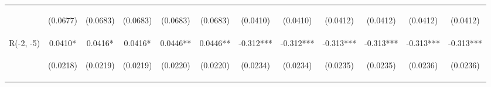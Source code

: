 \documentclass[]{article}
\begin{document}
\begin{center}
\begin{tabular}{lccccccccccc}
\vspace{4pt} & \begin{footnotesize}(0.0677)\end{footnotesize} & \begin{footnotesize}(0.0683)\end{footnotesize} & \begin{footnotesize}(0.0683)\end{footnotesize} & \begin{footnotesize}(0.0683)\end{footnotesize} & \begin{footnotesize}(0.0683)\end{footnotesize} & \begin{footnotesize}(0.0410)\end{footnotesize} & \begin{footnotesize}(0.0410)\end{footnotesize} & \begin{footnotesize}(0.0412)\end{footnotesize} & \begin{footnotesize}(0.0412)\end{footnotesize} & \begin{footnotesize}(0.0412)\end{footnotesize} & \begin{footnotesize}(0.0412)\end{footnotesize} \\
R(-2, -5) & 0.0410* & 0.0416* & 0.0416* & 0.0446** & 0.0446** & -0.312*** & -0.312*** & -0.313*** & -0.313*** & -0.313*** & -0.313*** \\
\vspace{4pt} & \begin{footnotesize}(0.0218)\end{footnotesize} & \begin{footnotesize}(0.0219)\end{footnotesize} & \begin{footnotesize}(0.0219)\end{footnotesize} & \begin{footnotesize}(0.0220)\end{footnotesize} & \begin{footnotesize}(0.0220)\end{footnotesize} & \begin{footnotesize}(0.0234)\end{footnotesize} & \begin{footnotesize}(0.0234)\end{footnotesize} & \begin{footnotesize}(0.0235)\end{footnotesize} & \begin{footnotesize}(0.0235)\end{footnotesize} & \begin{footnotesize}(0.0236)\end{footnotesize} & \begin{footnotesize}(0.0236)\end{footnotesize} \\

\end{tabular}
\end{center}
\end{document}
